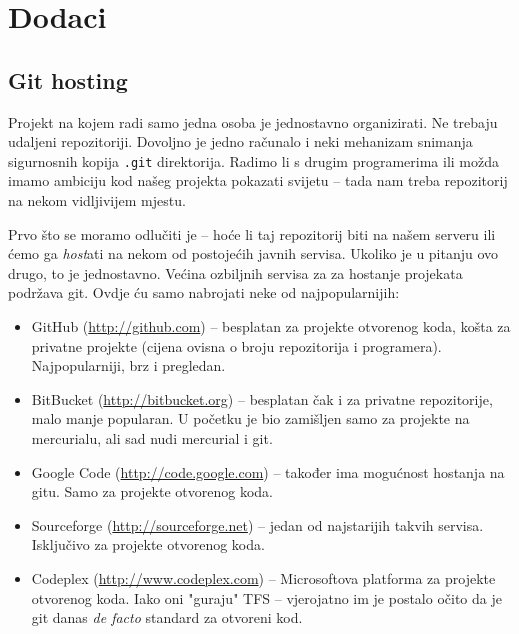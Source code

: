 \chapter*{Dodaci}

%

\section*{Git hosting}

Projekt na kojem radi samo jedna osoba je jednostavno organizirati. 
Ne trebaju udaljeni repozitoriji.
Dovoljno je jedno računalo i neki mehanizam snimanja sigurnosnih kopija \verb+.git+ direktorija.
Radimo li s drugim programerima ili možda imamo ambiciju kod našeg projekta pokazati svijetu -- tada nam treba repozitorij na nekom vidljivijem mjestu.

Prvo što se moramo odlučiti je -- hoće li taj repozitorij biti na našem serveru ili ćemo ga \emph{host}ati na nekom od postojećih javnih servisa.
Ukoliko je u pitanju ovo drugo, to je jednostavno.
Većina ozbiljnih servisa za za hostanje projekata podržava git.
Ovdje ću samo nabrojati neke od najpopularnijih:

\begin{itemize}
    \item GitHub (\url{http://github.com}) -- besplatan za projekte otvorenog koda, košta za privatne projekte (cijena ovisna o broju repozitorija i programera). Najpopularniji, brz i pregledan.
    \item BitBucket (\url{http://bitbucket.org}) -- besplatan čak i za privatne repozitorije, malo manje popularan. U početku je bio zamišljen samo za projekte na mercurialu, ali sad nudi mercurial i git.
    \item Google Code (\url{http://code.google.com}) -- također ima mogućnost hostanja na gitu. Samo za projekte otvorenog koda.
    \item Sourceforge (\url{http://sourceforge.net}) -- jedan od najstarijih takvih servisa. Isključivo za projekte otvorenog koda.
    \item Codeplex (\url{http://www.codeplex.com}) -- Microsoftova platforma za projekte otvorenog koda. Iako oni "guraju" TFS -- vjerojatno im je postalo očito da je git danas \emph{de facto} standard za otvoreni kod.
\end{itemize}


